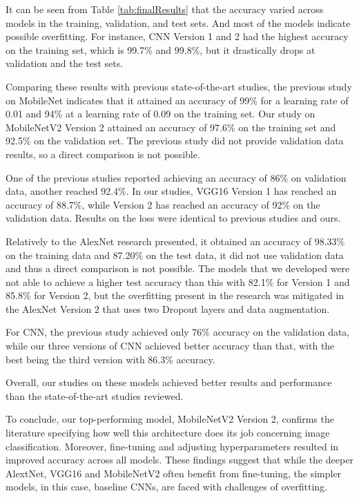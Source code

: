 \documentclass[conference]{IEEEtran}
\begin{document}
It can be seen from Table \ref{tab:finalResults} that the accuracy varied across models in the training, validation, and test sets. And most of the models indicate possible overfitting. For instance, CNN Version 1 and 2 had the highest accuracy on the training set, which is 99.7\% and 99.8\%, but it drastically drops at validation and the test sets.

Comparing these results with previous state-of-the-art studies, the previous study on MobileNet indicates that it attained an accuracy of 99\% for a learning rate of 0.01 and 94\% at a learning rate of 0.09 on the training set. Our study on MobileNetV2 Version 2 attained an accuracy of 97.6\% on the training set and 92.5\% on the validation set. The previous study did not provide validation data results, so a direct comparison is not possible.

One of the previous studies reported achieving an accuracy of 86\% on validation data, another reached 92.4\%. In our studies, VGG16 Version 1 has reached an accuracy of 88.7\%, while Version 2 has reached an accuracy of 92\% on the validation data. Results on the loss were identical to previous studies and ours.

Relatively to the AlexNet research presented, it obtained an accuracy of 98.33\% on the training data and 87.20\% on the test data, it did not use validation data and thus a direct comparison is not possible. The models that we developed were not able to achieve a higher test accuracy than this with 82.1\% for Version 1 and 85.8\% for Version 2, but the overfitting present in the research was mitigated in the AlexNet Version 2 that uses two Dropout layers and data augmentation.

For CNN, the previous study achieved only 76\% accuracy on the validation data, while our three versions of CNN achieved better accuracy than that, with the best being the third version with 86.3\% accuracy.

Overall, our studies on these models achieved better results and performance than the state-of-the-art studies reviewed.

To conclude, our top-performing model, MobileNetV2 Version 2, confirms the literature specifying how well this architecture does its job concerning image classification. Moreover, fine-tuning and adjusting hyperparameters resulted in improved accuracy across all models. These findings suggest that while the deeper AlextNet, VGG16 and MobileNetV2 often benefit from fine-tuning, the simpler models, in this case, baseline CNNs, are faced with challenges of overfitting.
\end{document}

